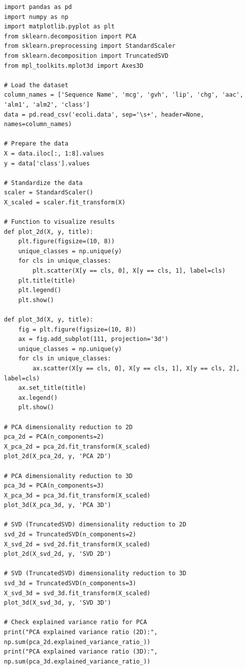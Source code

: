 \documentclass{article}
\begin{document}
\begin{verbatim}
import pandas as pd
import numpy as np
import matplotlib.pyplot as plt
from sklearn.decomposition import PCA
from sklearn.preprocessing import StandardScaler
from sklearn.decomposition import TruncatedSVD
from mpl_toolkits.mplot3d import Axes3D

# Load the dataset
column_names = ['Sequence Name', 'mcg', 'gvh', 'lip', 'chg', 'aac', 'alm1', 'alm2', 'class']
data = pd.read_csv('ecoli.data', sep='\s+', header=None, names=column_names)

# Prepare the data
X = data.iloc[:, 1:8].values  
y = data['class'].values 

# Standardize the data
scaler = StandardScaler()
X_scaled = scaler.fit_transform(X)

# Function to visualize results
def plot_2d(X, y, title):
    plt.figure(figsize=(10, 8))
    unique_classes = np.unique(y)
    for cls in unique_classes:
        plt.scatter(X[y == cls, 0], X[y == cls, 1], label=cls)
    plt.title(title)
    plt.legend()
    plt.show()

def plot_3d(X, y, title):
    fig = plt.figure(figsize=(10, 8))
    ax = fig.add_subplot(111, projection='3d')
    unique_classes = np.unique(y)
    for cls in unique_classes:
        ax.scatter(X[y == cls, 0], X[y == cls, 1], X[y == cls, 2], label=cls)
    ax.set_title(title)
    ax.legend()
    plt.show()

# PCA dimensionality reduction to 2D
pca_2d = PCA(n_components=2)
X_pca_2d = pca_2d.fit_transform(X_scaled)
plot_2d(X_pca_2d, y, 'PCA 2D')

# PCA dimensionality reduction to 3D
pca_3d = PCA(n_components=3)
X_pca_3d = pca_3d.fit_transform(X_scaled)
plot_3d(X_pca_3d, y, 'PCA 3D')

# SVD (TruncatedSVD) dimensionality reduction to 2D
svd_2d = TruncatedSVD(n_components=2)
X_svd_2d = svd_2d.fit_transform(X_scaled)
plot_2d(X_svd_2d, y, 'SVD 2D')

# SVD (TruncatedSVD) dimensionality reduction to 3D
svd_3d = TruncatedSVD(n_components=3)
X_svd_3d = svd_3d.fit_transform(X_scaled)
plot_3d(X_svd_3d, y, 'SVD 3D')

# Check explained variance ratio for PCA
print("PCA explained variance ratio (2D):", np.sum(pca_2d.explained_variance_ratio_))
print("PCA explained variance ratio (3D):", np.sum(pca_3d.explained_variance_ratio_))
\end{verbatim}
\end{document}
